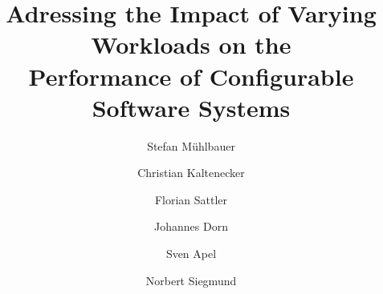 \documentclass[sigconf,screen,anonymous]{acmart}
\begin{document}
	
	\title[Adressing the Impact of Varying Workloads on the Performance of Configurable Software Systems]{\texorpdfstring{Adressing the Impact of  Varying Workloads on the\\ Performance of Configurable Software Systems}{Adressing the Impact of  Varying Workloads on the Performance of Configurable Software Systems}}
	
	\author{Stefan Mühlbauer}

	\author{Christian Kaltenecker}
	
	\author{Florian Sattler}

	\author{Johannes Dorn}

	\author{Sven Apel}

	\author{Norbert Siegmund}
	
	

	
	\renewcommand{\shortauthors}{Mühlbauer et al.}
	
	
	
\end{document}
